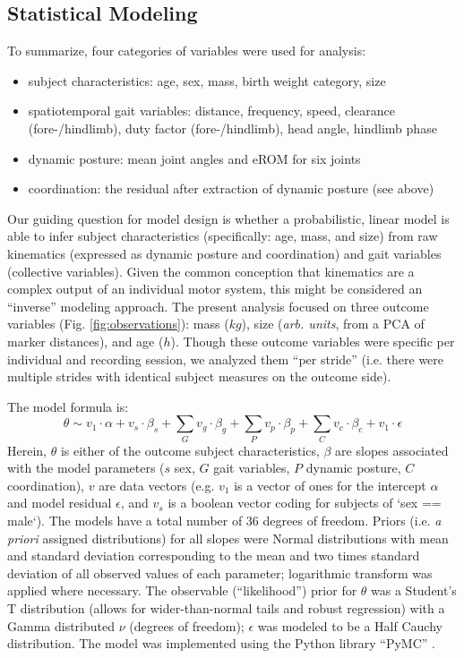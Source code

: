 \subsection{Statistical Modeling}
\label{sec:org7326405}
To summarize, four categories of variables were used for analysis:
\begin{itemize}
\item subject characteristics: age, sex, mass, birth weight category, size
\item spatiotemporal gait variables: distance, frequency, speed, clearance (fore-/hindlimb), duty factor (fore-/hindlimb), head angle, hindlimb phase
\item dynamic posture: mean joint angles and eROM for six joints
\item coordination: the residual after extraction of dynamic posture (see above)
\end{itemize}

Our guiding question for model design is whether a probabilistic, linear model is able to infer subject characteristics (specifically: age, mass, and size) from raw kinematics (expressed as dynamic posture and coordination) and gait variables (collective variables).
Given the common conception that kinematics are a complex output of an individual motor system, this might be considered an ``inverse'' modeling approach.
The present analysis focused on three outcome variables (Fig. \ref{fig:observations}): mass (\(kg\)), size (\emph{arb. units}, from a PCA of marker distances), and age (\(h\)).
Though these outcome variables were specific per individual and recording session, we analyzed them ``per stride'' (i.e. there were multiple strides with identical subject measures on the outcome side).


The model formula is:
\begin{equation} \theta \sim v_{1}\cdot\alpha + v_{s}\cdot\beta_{s} + \sum\limits_{G} v_{g}\cdot\beta_{g} + \sum\limits_{P}  v_{p}\cdot\beta_{p} +  \sum\limits_{C} v_{c}\cdot\beta_{c} + v_{1}\cdot\epsilon \label{eq:model} \end{equation}
Herein, \(\theta\) is either of the outcome subject characteristics, \(\beta\) are slopes associated with the model parameters (\(s\) sex, \(G\) gait variables, \(P\) dynamic posture, \(C\) coordination), \(v\) are data vectors (e.g. \(v_{1}\) is a vector of ones for the intercept \(\alpha\) and model residual \(\epsilon\), and \(v_{s}\) is a boolean vector coding for subjects of `sex == male`).
The models have a total number of 36 degrees of freedom.
Priors (i.e. \emph{a priori} assigned distributions) for all slopes were Normal distributions with mean and standard deviation corresponding to the mean and two times standard deviation of all observed values of each parameter; logarithmic transform was applied where necessary.
The observable (``likelihood'') prior for \(\theta\) was a Student's T distribution (allows for wider-than-normal tails and robust regression) with a Gamma distributed \(\nu\) (degrees of freedom); \(\epsilon\) was modeled to be a Half Cauchy distribution.
The model was implemented using the Python library ``PyMC'' \citep[version 4.2.2,][]{Salvatier2016}.


